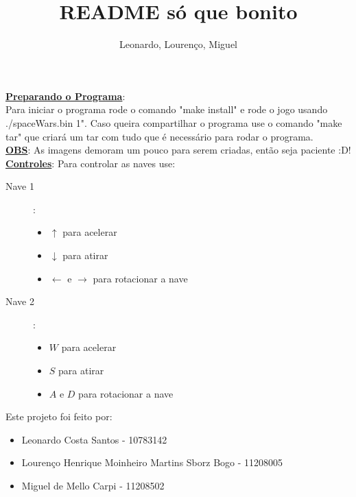 \documentclass[12pt]{article}
\title{README só que bonito}
\author{Leonardo, Lourenço, Miguel}
\date{}
\newcommand{\mytitle}[1]{\textbf{\underline{#1}}}
\begin{document}
\maketitle
\noindent\mytitle{Preparando o Programa}:\\
Para iniciar o programa rode o comando "make install" e rode o jogo usando ./spaceWars.bin 1". Caso queira compartilhar o programa use o comando "make tar" que criará um tar com tudo que é necessário para rodar o programa.\\
\mytitle{OBS}: As imagens demoram um pouco para serem criadas, então seja paciente :D!\\
\mytitle{Controles}: Para controlar as naves use:
\begin{description}
\item[Nave 1]:
  \begin{itemize}
  \item $\uparrow$ para acelerar
  \item $\downarrow$ para atirar
  \item $\leftarrow$ e $\rightarrow$ para rotacionar a nave
  \end{itemize}
\item[Nave 2]:
  \begin{itemize}
  \item $W$ para acelerar
  \item $S$ para atirar
  \item $A$ e $D$ para rotacionar a nave
  \end{itemize}
\end{description}
Este projeto foi feito por:
\begin{itemize}
\item Leonardo Costa Santos - 10783142
\item Lourenço Henrique Moinheiro Martins Sborz Bogo - 11208005
\item Miguel de Mello Carpi - 11208502
\end{itemize}
\end{document}

